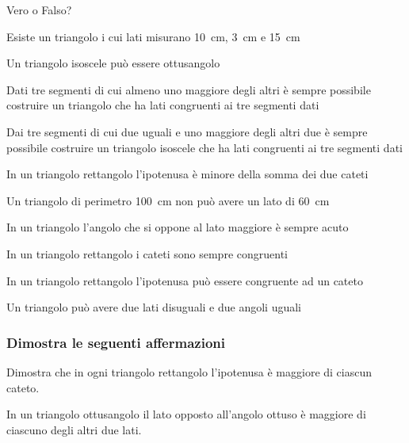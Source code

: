 \begin{multicols}{2}
\begin{esercizio}
\label{ese:3.82}
Vero o Falso? 
\begin{enumeratea}
\item Esiste un triangolo i cui lati misurano 10~cm, 3~cm e 
15~cm\hfill\boxV\quad\boxF
\item Un triangolo isoscele può essere 
ottusangolo\hfill\boxV\quad\boxF
\item Dati tre segmenti di cui almeno uno maggiore degli altri è 
sempre possibile costruire un triangolo che ha lati congruenti ai tre 
segmenti dati\hfill\boxV\quad\boxF
\item Dai tre segmenti di cui due uguali e uno maggiore degli altri 
due è sempre possibile costruire un triangolo isoscele che ha lati 
congruenti ai tre segmenti dati\hfill\boxV\quad\boxF
\item In un triangolo rettangolo l'ipotenusa è minore della somma dei 
due cateti\hfill\boxV\quad\boxF
\item Un triangolo di perimetro 100~cm non può avere un lato di 
60~cm\hfill\boxV\quad\boxF
\item In un triangolo l'angolo che si oppone al lato maggiore è 
sempre acuto\hfill\boxV\quad\boxF
\item In un triangolo rettangolo i cateti sono sempre 
congruenti\hfill\boxV\quad\boxF
\item In un triangolo rettangolo l'ipotenusa può essere congruente ad 
un cateto\hfill\boxV\quad\boxF
\item Un triangolo può avere due lati disuguali e due angoli 
uguali\hfill\boxV\quad\boxF
\end{enumeratea}
\end{esercizio}

\subsubsection*{Dimostra le seguenti affermazioni}

\begin{multicols}{2}

\begin{esercizio}
\label{ese:3.84}
Dimostra che in ogni triangolo rettangolo l'ipotenusa è maggiore di 
ciascun cateto.
\end{esercizio}

\begin{esercizio}
\label{ese:3.86}
In un triangolo ottusangolo il lato opposto all'angolo ottuso è 
maggiore di ciascuno degli altri due lati.
\end{esercizio}


\end{multicols}
\end{multicols}
